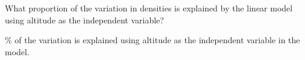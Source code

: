 What proportion of the variation in densities is explained by the linear model using altitude as the independent variable?

\% of the variation is explained using altitude as the independent variable in the model.

